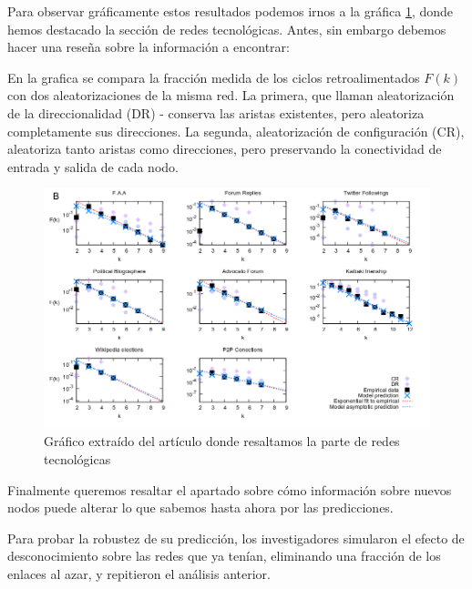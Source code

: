 \documentclass[1p]{elsarticle}
\begin{document}
Para observar gráficamente estos resultados podemos irnos a la gráfica \ref{h1}, donde hemos destacado la sección de redes tecnológicas. Antes, sin embargo debemos hacer una reseña sobre la información a encontrar:

 En la grafica se compara la fracción medida de los ciclos retroalimentados $F(k)$ con dos aleatorizaciones de la misma red. La primera, que llaman aleatorización de la direccionalidad (DR) - conserva las aristas existentes, pero aleatoriza completamente sus direcciones. La segunda, aleatorización de configuración (CR), aleatoriza tanto aristas como direcciones, pero preservando la conectividad de entrada y salida de cada nodo.
\begin{figure}
	\centering
	\includegraphics[width=15cm]{graf_2.png}
	\caption{Gráfico extraído del artículo donde resaltamos la parte de redes tecnológicas}
	\label{h1}
\end{figure}

Finalmente queremos resaltar el apartado sobre cómo información sobre nuevos nodos puede alterar lo que sabemos hasta ahora por las predicciones.

 Para probar la robustez
de su predicción, los investigadores simularon el efecto de desconocimiento sobre las redes que ya tenían,
eliminando una fracción de los enlaces al azar, y repitieron el análisis anterior. 
\end{document}
